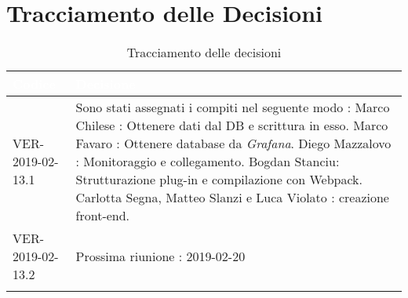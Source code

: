 
\newpage
\section{Tracciamento delle Decisioni}

\begin{longtable}{|C{.40\textwidth}|C{.60\textwidth}|}
\hline
{}\textbf{\textcolor{white}{Codice}} & \textbf{\textcolor{white}{Decisione}}\\
\hline
VER-2019-02-13.1 &  Sono stati assegnati i compiti nel seguente modo : 
Marco Chilese : Ottenere dati dal DB e scrittura in esso.
Marco Favaro : Ottenere database da \textit{Grafana}.
Diego Mazzalovo : Monitoraggio e collegamento.
Bogdan Stanciu: Strutturazione plug-in e compilazione con Webpack.
Carlotta Segna, Matteo Slanzi e Luca Violato : creazione front-end.\\
\hline
{} VER-2019-02-13.2 & Prossima riunione : 2019-02-20 \\
\hline

\caption{Tracciamento delle decisioni}
\end{longtable}
